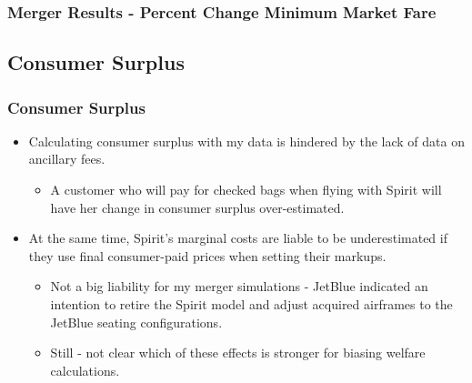 \documentclass[xcolor=dvipsnames]{beamer}
\let\Oldsubsection\subsection
\renewcommand{\subsection}{\FloatBarrier\Oldsubsection}
\begin{document}
    \begin{frame}
        \frametitle{Merger Results - Percent Change Minimum Market Fare}
    \vspace{-12mm}
   \begin{table}
   \resizebox{0.9\linewidth}{!}{%
        \begin{tabular}[t]{lrrrrrr}
\toprule
\multicolumn{1}{c}{ } & \multicolumn{3}{c}{Pre-Pandemic} & \multicolumn{3}{c}{Post-Pandemic} \\
\cmidrule(l{3pt}r{3pt}){2-4} \cmidrule(l{3pt}r{3pt}){5-7}
 & Best & Average & Worst & Best & Average & Worst\\
\midrule
$<$ 0 & 256 & 206 & 167 & 389 & 302 & 230\\
0-25 & 1186 & 830 & 710 & 1058 & 650 & 617\\
25-50 & 56 & 419 & 383 & 53 & 414 & 300\\
50-75 & 19 & 62 & 206 & 28 & 137 & 246\\
75-100 & 11 & 11 & 56 & 16 & 36 & 109\\
100 $<$ & 5 & 5 & 11 & 10 & 15 & 52\\
\bottomrule
\end{tabular}
    }
    \end{table}
    \end{frame}

    \subsection{Consumer Surplus}
    \begin{frame}
        \frametitle{Consumer Surplus}
        \begin{itemize}
            \item Calculating consumer surplus with my data is hindered by the lack of data on ancillary fees.\begin{itemize}
            \item A customer who will pay for checked bags when flying with Spirit will have her change in consumer surplus over-estimated.    
            \end{itemize}
            \item At the same time, Spirit's marginal costs are liable to be underestimated if they use final consumer-paid prices when setting their markups.
            \begin{itemize}
                \item Not a big liability for my merger simulations - JetBlue indicated an intention to retire the Spirit model and adjust acquired airframes to the JetBlue seating configurations.
                \item Still - not clear which of these effects is stronger for biasing welfare calculations.
            \end{itemize}
        \end{itemize}
    \end{frame}
\end{document}
